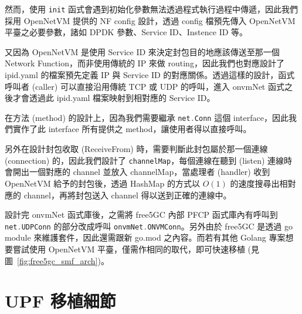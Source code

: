 然而，使用 \lstinline[language=Go]{init} 函式會遇到初始化參數無法透過程式執行過程中傳遞，因此我們採用 OpenNetVM 提供的 NF config 設計，透過 config 檔預先傳入 OpenNetVM 平臺之必要參數，諸如 DPDK 參數、Service ID、Instence ID 等。

又因為 OpenNetVM 是使用 Service ID 來決定封包目的地應該傳送至那一個 Network Function，而非使用傳統的 IP 來做 routing，因此我們也對應設計了 ipid.yaml 的檔案預先定義 IP 與 Service ID 的對應關係。透過這樣的設計，函式呼叫者 (caller) 可以直接沿用傳統 TCP 或 UDP 的呼叫，進入 onvmNet 函式之後才會透過此 ipid.yaml 檔案映射到相對應的 Service ID。

在方法 (method) 的設計上，因為我們需要繼承 \lstinline[language=Go]{net.Conn} 這個 interface，因此我們實作了此 interface 所有提供之 method，讓使用者得以直接呼叫。

另外在設計封包收取 (ReceiveFrom) 時，需要判斷此封包屬於那一個連線 (connection) 的，因此我們設計了 \lstinline{channelMap}，每個連線在聽到 (listen) 連線時會開出一個對應的 channel 並放入 channelMap，當處理者 (handler) 收到 OpenNetVM 給予的封包後，透過 HashMap 的方式以 $O(1)$ 的速度搜尋出相對應的 channel，再將封包送入 channel 得以送到正確的連線中。


設計完 onvmNet 函式庫後，之需將 free5GC 內部 PFCP 函式庫內有呼叫到 \lstinline[language=Go]{net.UDPConn} 的部分改成呼叫 \lstinline[language=Go]{onvmNet.ONVMConn}。另外由於 free5GC 是透過 go module 來維護套件，因此還需跟新 go.mod 之內容。而若有其他 Golang 專案想要嘗試使用 OpenNetVM 平臺，僅需作相同的取代，即可快速移植 (見圖~\ref{fig:free5gc_smf_arch})。

\section{UPF 移植細節}
\label{sec:upf_porting}
